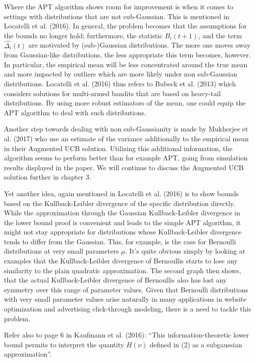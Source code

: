 \documentclass[12pt,]{article}
\begin{document}
Where the APT algorithm shows room for improvement is when it comes to
settings with distributions that are not sub-Gaussian. This is mentioned
in Locatelli et al. (2016). In general, the problem becomes that the
assumptions for the bounds no longer hold; furthermore, the statistic
\(B_i(t+1)\), and the term \(\hat{\Delta_i}(t)\) are motivated by
(sub-)Gaussian distributions. The more one moves away from Gaussian-like
distributions, the less appropriate this term becomes, however. In
particular, the empirical mean will be less concentrated around the true
mean and more impacted by outliers which are more likely under non
sub-Gaussian distributions. Locatelli et al. (2016) thus refers to
Bubeck et al. (2013) which considers solutions for multi-armed bandits
that are based on heavy-tail distributions. By using more robust
estimators of the mean, one could equip the APT algorithm to deal with
such distributions.

Another step towards dealing with non sub-Gaussianity is made by
Mukherjee et al. (2017) who use an estimate of the variance additionally
to the empirical mean in their Augmented UCB solution. Utilizing this
additional information, the algorithm seems to perform better than for
example APT, going from simulation results displayed in the paper. We
will continue to discuss the Augmented UCB solution further in chapter
3.

Yet another idea, again mentioned in Locatelli et al. (2016) is to show
bounds based on the Kullback-Leibler divergence of the specific
distribution directly. While the approximation through the Gaussian
Kullback-Leibler divergence in the lower bound proof is convenient and
leads to the simple APT algorithm, it might not stay appropriate for
distributions whose Kullback-Leibler divergence tends to differ from the
Gaussian. This, for example, is the case for Bernoulli distributions at
very small parameters \(\mu\). It's quite obvious simply by looking at
examples that the Kullback-Leibler divergence of Bernoullis starts to
lose any similarity to the plain quadratic approximation. The second
graph then shows, that the actual Kullback-Leibler divergence of
Bernoullis also has lost any symmetry over this range of parameter
values. Given that Bernoulli distributions with very small parameter
values arise naturally in many applications in website optimization and
advertising click-through modeling, there is a need to tackle this
problem.

Refer also to page 6 in Kaufmann et al. (2016): ``This
information-theoretic lower bound permits to interpret the quantity
\(H(\nu)\) defined in (2) as a subgaussian approximation''.
\end{document}
